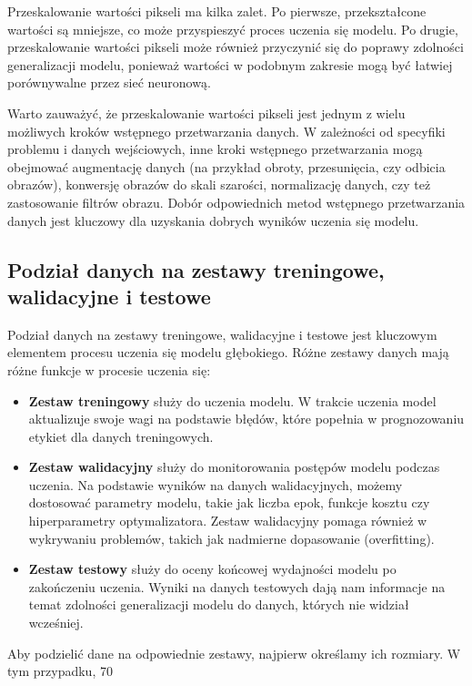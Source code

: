 Przeskalowanie wartości pikseli ma kilka zalet. Po pierwsze, przekształcone wartości są mniejsze, co może przyspieszyć proces uczenia się modelu. Po drugie, przeskalowanie wartości pikseli może również przyczynić się do poprawy zdolności generalizacji modelu, ponieważ wartości w podobnym zakresie mogą być łatwiej porównywalne przez sieć neuronową.

Warto zauważyć, że przeskalowanie wartości pikseli jest jednym z wielu możliwych kroków wstępnego przetwarzania danych. W zależności od specyfiki problemu i danych wejściowych, inne kroki wstępnego przetwarzania mogą obejmować augmentację danych (na przykład obroty, przesunięcia, czy odbicia obrazów), konwersję obrazów do skali szarości, normalizację danych, czy też zastosowanie filtrów obrazu. Dobór odpowiednich metod wstępnego przetwarzania danych jest kluczowy dla uzyskania dobrych wyników uczenia się modelu.

\subsection{Podział danych na zestawy treningowe, walidacyjne i testowe}
Podział danych na zestawy treningowe, walidacyjne i testowe jest kluczowym elementem procesu uczenia się modelu głębokiego. Różne zestawy danych mają różne funkcje w procesie uczenia się:

\begin{itemize}
\item \textbf{Zestaw treningowy} służy do uczenia modelu. W trakcie uczenia model aktualizuje swoje wagi na podstawie błędów, które popełnia w prognozowaniu etykiet dla danych treningowych.
\item \textbf{Zestaw walidacyjny} służy do monitorowania postępów modelu podczas uczenia. Na podstawie wyników na danych walidacyjnych, możemy dostosować parametry modelu, takie jak liczba epok, funkcje kosztu czy hiperparametry optymalizatora. Zestaw walidacyjny pomaga również w wykrywaniu problemów, takich jak nadmierne dopasowanie (overfitting).
\item \textbf{Zestaw testowy} służy do oceny końcowej wydajności modelu po zakończeniu uczenia. Wyniki na danych testowych dają nam informacje na temat zdolności generalizacji modelu do danych, których nie widział wcześniej.
\end{itemize}

Aby podzielić dane na odpowiednie zestawy, najpierw określamy ich rozmiary. W tym przypadku, 70%

